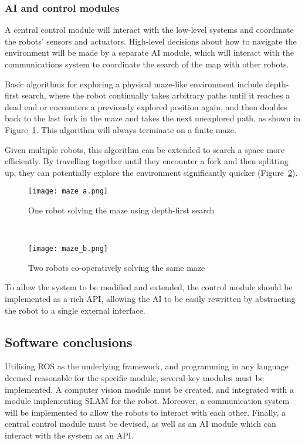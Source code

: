 \subsubsection{AI and control modules}\label{design/software/ai}

A central control module will interact with the low-level systems and coordinate the
robots' sensors and actuators. High-level decisions about how to navigate the environment
will be made by a separate AI module, which will interact with the communications
system to coordinate the search of the map with other robots.

Basic algorithms for exploring a physical maze-like environment include depth-first
search, where the robot continually takes arbitrary paths until it reaches a dead end
or encounters a previously explored position again, and then doubles back to the last
fork in the maze and takes the next unexplored path, as shown in Figure~\ref{figure:maze/a}.
This algorithm will always terminate on a finite maze.

Given multiple robots, this algorithm can be extended to search a space more efficiently.
By travelling together until they encounter a fork and then splitting up, they can
potentially explore the environment significantly quicker (Figure~\ref{figure:maze/b}).

\begin{figure*}[t!]
    \centering
    \begin{subfigure}[t]{0.5\textwidth}
        \centering
        \texttt{[image: maze\_a.png]}
        \caption{One robot solving the maze using depth-first search}\label{figure:maze/a}
    \end{subfigure}%
    ~
    \begin{subfigure}[t]{0.5\textwidth}
        \centering
        \texttt{[image: maze\_b.png]}
        \caption{Two robots co-operatively solving the same maze}\label{figure:maze/b}
    \end{subfigure}
    \caption{Example of robots solving a simple maze}
\end{figure*}

To allow the system to be modified and extended, the control module should be implemented as a rich API, allowing the AI to be easily rewritten by abstracting the robot to a single external interface.

\subsection{Software conclusions}\label{design/software/conclusion}
Utilising ROS as the underlying framework, and programming in any language deemed reasonable for the specific module, several key modules must be implemented. A computer vision module must be created, and integrated with a module implementing SLAM for the robot. Moreover, a communication system will be implemented to allow the robots to interact with each other. Finally, a central control module must be devised, as well as an AI module which can interact with the system as an API.

